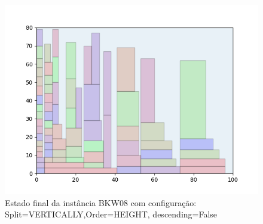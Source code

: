 \begin{figure}[H]
    \centering
    \caption[]{Estado final da instância BKW08 com configuração: Split=VERTICALLY,Order=HEIGHT, descending=False}
    \label{fig:bkw08-vertically-height-false}
    \includegraphics[scale=0.5]{output/figures/bkw/bkw08/vertically/height/false/00}
\end{figure}